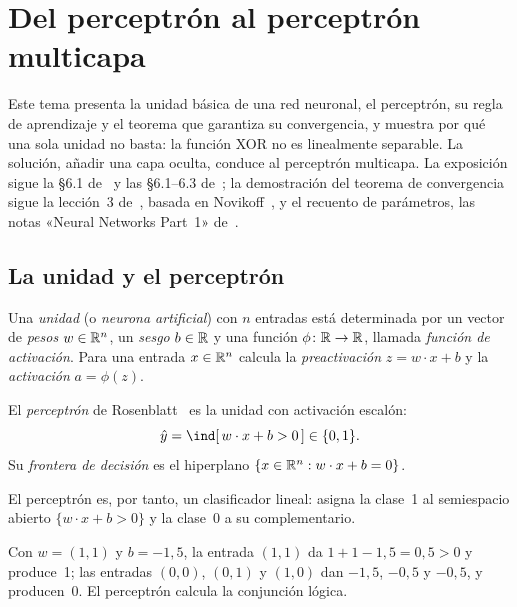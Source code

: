 \chapter{Del perceptrón al perceptrón multicapa}
\label{tema:1}

Este tema presenta la unidad básica de una red neuronal, el perceptrón, su regla de aprendizaje y el teorema que garantiza su convergencia, y muestra por qué una sola unidad no basta: la función XOR no es linealmente separable. La solución, añadir una capa oculta, conduce al perceptrón multicapa. La exposición sigue la §6.1 de~\cite{gbc} y las §6.1--6.3 de~\cite{jm3}; la demostración del teorema de convergencia sigue la lección~3 de~\cite{cs4780}, basada en Novikoff~\cite{novikoff}, y el recuento de parámetros, las notas «Neural Networks Part~1» de~\cite{cs231n}.

\section{La unidad y el perceptrón}

\begin{definicion}[Unidad]\label{def:unidad}
Una \emph{unidad} (o \emph{neurona artificial}) con $n$ entradas está determinada por un vector de \emph{pesos} $w\in\mathbb{R}^{n}$, un \emph{sesgo} $b\in\mathbb{R}$ y una función $\phi\colon\mathbb{R}\to\mathbb{R}$, llamada \emph{función de activación}. Para una entrada $x\in\mathbb{R}^{n}$ calcula la \emph{preactivación} $z=w\cdot x+b$ y la \emph{activación} $a=\phi(z)$.
\end{definicion}

\begin{definicion}[Perceptrón]\label{def:perceptron}
El \emph{perceptrón} de Rosenblatt~\cite{rosenblatt} es la unidad con activación escalón:
\[
\hat y=\ind[\,w\cdot x+b>0\,]\in\{0,1\}.
\]
Su \emph{frontera de decisión} es el hiperplano $\{x\in\mathbb{R}^{n}:w\cdot x+b=0\}$.
\end{definicion}

El perceptrón es, por tanto, un clasificador lineal: asigna la clase~1 al semiespacio abierto $\{w\cdot x+b>0\}$ y la clase~0 a su complementario.

\begin{ejemplo}\label{ej:and}
Con $w=(1,1)$ y $b=-1{,}5$, la entrada $(1,1)$ da $1+1-1{,}5=0{,}5>0$ y produce~1; las entradas $(0,0)$, $(0,1)$ y $(1,0)$ dan $-1{,}5$, $-0{,}5$ y $-0{,}5$, y producen~0. El perceptrón calcula la conjunción lógica.
\end{ejemplo}


